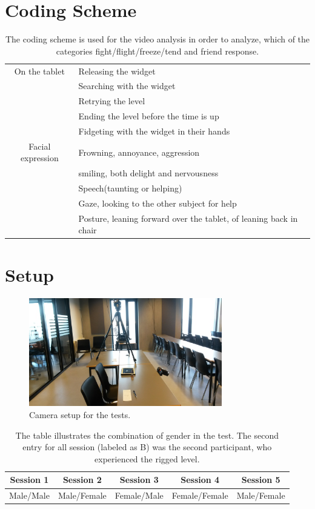 \section*{Coding Scheme}
\begin{table}
\begin{tabular}{|c|l|}
\hline 
On the tablet & Releasing the widget\\
& Searching with the widget\\
& Retrying the level\\
& Ending the level before the time is up\\
& Fidgeting with the widget in their hands\\
\hline 
Facial expression & Frowning, annoyance, aggression\\
& smiling, both delight and nervousness\\
& Speech(taunting or helping)\\
& Gaze, looking to the other subject for help\\
& Posture, leaning forward over the tablet, of leaning back in chair \\ 
\hline 
\end{tabular} 
\caption{The coding scheme is used for the video analysis in order to analyze, which of the categories fight/flight/freeze/tend and friend response.}
\end{table}\label{tab: prelim}

\section*{Setup}
\begin{figure}[!h]
\includegraphics[width=0.75\textwidth]{img/setup}
\caption{Camera setup for the tests.}
\end{figure}\label{fig: cam_set}

\begin{table}
\begin{tabular}{|c|c|c|c|c|}
\hline 
Session 1 & Session 2 & Session 3 & Session 4 & Session 5 \\ 
\hline 
Male/Male & Male/Female & Female/Male & Female/Female & Male/Female \\ 
\hline 
\end{tabular} 
\caption{The table illustrates the combination of gender in the test. The second entry for all session (labeled as B) was the second participant, who experienced the rigged level.}
\end{table}\label{tab: pairs}
